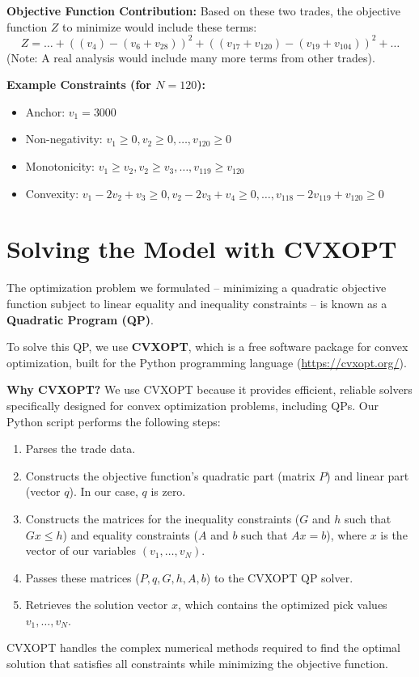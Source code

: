 \documentclass{article}
\begin{document}
\textbf{Objective Function Contribution:}
Based on these two trades, the objective function $Z$ to minimize would include these terms:
\[
Z = \dots + \left( (v_4) - (v_6 + v_{28}) \right)^2 + \left( (v_{17} + v_{120}) - (v_{19} + v_{104}) \right)^2 + \dots
\]
(Note: A real analysis would include many more terms from other trades).

\textbf{Example Constraints (for $N=120$):}
\begin{itemize}
    \item Anchor: $v_1 = 3000$
    \item Non-negativity: $v_1 \ge 0, v_2 \ge 0, \dots, v_{120} \ge 0$
    \item Monotonicity: $v_1 \ge v_2, v_2 \ge v_3, \dots, v_{119} \ge v_{120}$
    \item Convexity: $v_1 - 2v_2 + v_3 \ge 0, v_2 - 2v_3 + v_4 \ge 0, \dots, v_{118} - 2v_{119} + v_{120} \ge 0$
\end{itemize}

\section{Solving the Model with CVXOPT}

The optimization problem we formulated – minimizing a quadratic objective function subject to linear equality and inequality constraints – is known as a \textbf{Quadratic Program (QP)}.

To solve this QP, we use \textbf{CVXOPT}, which is a free software package for convex optimization, built for the Python programming language (\url{https://cvxopt.org/}).

\textbf{Why CVXOPT?} We use CVXOPT because it provides efficient, reliable solvers specifically designed for convex optimization problems, including QPs. Our Python script performs the following steps:
\begin{enumerate}
    \item Parses the trade data.
    \item Constructs the objective function's quadratic part (matrix $P$) and linear part (vector $q$). In our case, $q$ is zero.
    \item Constructs the matrices for the inequality constraints ($G$ and $h$ such that $Gx \le h$) and equality constraints ($A$ and $b$ such that $Ax = b$), where $x$ is the vector of our variables $(v_1, \dots, v_N)$.
    \item Passes these matrices ($P, q, G, h, A, b$) to the CVXOPT QP solver.
    \item Retrieves the solution vector $x$, which contains the optimized pick values $v_1, \dots, v_N$.
\end{enumerate}
CVXOPT handles the complex numerical methods required to find the optimal solution that satisfies all constraints while minimizing the objective function.
\end{document}
